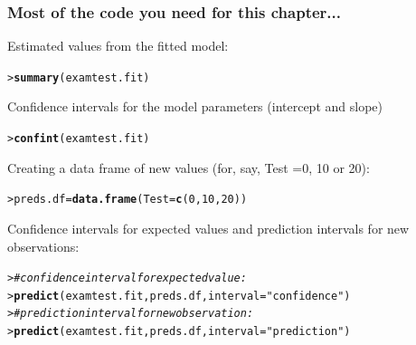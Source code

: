 \documentclass{beamer}\usepackage[]{graphicx}\usepackage[]{xcolor}
\makeatletter
\newcommand{\hlnum}[1]{\textcolor[rgb]{0.686,0.059,0.569}{#1}}%
\newcommand{\hlstr}[1]{\textcolor[rgb]{0.192,0.494,0.8}{#1}}%
\newcommand{\hlcom}[1]{\textcolor[rgb]{0.678,0.584,0.686}{\textit{#1}}}%
\newcommand{\hlstd}[1]{\textcolor[rgb]{0.345,0.345,0.345}{#1}}%
\newcommand{\hlkwb}[1]{\textcolor[rgb]{0.69,0.353,0.396}{#1}}%
\newcommand{\hlkwc}[1]{\textcolor[rgb]{0.333,0.667,0.333}{#1}}%
\newcommand{\hlkwd}[1]{\textcolor[rgb]{0.737,0.353,0.396}{\textbf{#1}}}%
\newenvironment{kframe}{%
 \def\at@end@of@kframe{}%
 \ifinner\ifhmode%
  \def\at@end@of@kframe{\end{minipage}}%
  \begin{minipage}{\columnwidth}%
 \fi\fi%
 \def\FrameCommand##1{\hskip\@totalleftmargin \hskip-\fboxsep
 \colorbox{shadecolor}{##1}\hskip-\fboxsep
     \hskip-\linewidth \hskip-\@totalleftmargin \hskip\columnwidth}%
 \MakeFramed {\advance\hsize-\width
   \@totalleftmargin\z@ \linewidth\hsize
   \@setminipage}}%
 {\par\unskip\endMakeFramed%
 \at@end@of@kframe}
\newenvironment{knitrout}{}{} %
\makeatother
\begin{document}
\begin{frame}[fragile]
\frametitle{Most of the  code you need for this chapter...}

Estimated values from the fitted model:

\begin{knitrout}\scriptsize
{}\color{fgcolor}\begin{kframe}
\begin{alltt}
\hlstd{> }\hlkwd{summary}\hlstd{(examtest.fit)}
\end{alltt}
\end{kframe}
\end{knitrout}
Confidence intervals for the model parameters (intercept and slope)

\begin{knitrout}\scriptsize
{}\color{fgcolor}\begin{kframe}
\begin{alltt}
\hlstd{> }\hlkwd{confint}\hlstd{(examtest.fit)}
\end{alltt}
\end{kframe}
\end{knitrout}

Creating a  data frame of new values (for, say,  Test =0, 10 or 20):
\begin{knitrout}\scriptsize
{}\color{fgcolor}\begin{kframe}
\begin{alltt}
\hlstd{> }\hlstd{preds.df}\hlkwb{=}\hlkwd{data.frame}\hlstd{(}\hlkwc{Test}\hlstd{=}\hlkwd{c}\hlstd{(}\hlnum{0}\hlstd{,}\hlnum{10}\hlstd{,}\hlnum{20}\hlstd{))}
\end{alltt}
\end{kframe}
\end{knitrout}
Confidence intervals for expected values and prediction intervals for new observations:
\begin{knitrout}\scriptsize
{}\color{fgcolor}\begin{kframe}
\begin{alltt}
\hlstd{> }\hlcom{# confidence interval for expected value:}
\hlstd{> }\hlkwd{predict}\hlstd{(examtest.fit, preds.df,} \hlkwc{interval}\hlstd{=}\hlstr{"confidence"}\hlstd{)}
\hlstd{> }\hlcom{# prediction interval for new observation:}
\hlstd{> }\hlkwd{predict}\hlstd{(examtest.fit, preds.df,} \hlkwc{interval}\hlstd{=}\hlstr{"prediction"}\hlstd{)}
\end{alltt}
\end{kframe}
\end{knitrout}

\end{frame}
\end{document}
